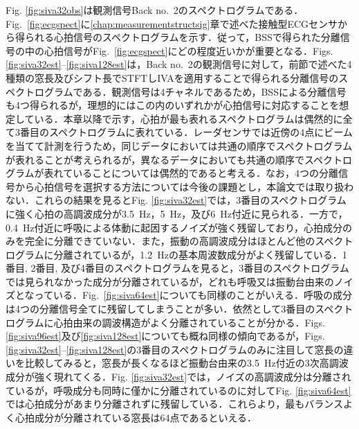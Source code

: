 Fig. \ref{fig:siva32obs}は観測信号Back no.~2のスペクトログラムである．Fig.~\ref{fig:ecgspect}に\ref{chap:measurementstructsig}章で述べた接触型ECGセンサから得られる心拍信号のスペクトログラムを示す．従って，BSSで得られた分離信号の中の心拍信号がFig.~\ref{fig:ecgspect}にどの程度近いかが重要となる．Figs. \ref{fig:siva32est}--\ref{fig:siva128est}は，Back no.~2の観測信号に対して，前節で述べた4種類の窓長及びシフト長でSTFTしIVAを適用することで得られる分離信号のスペクトログラムである．観測信号は4チャネルであるため，BSSによる分離信号も4つ得られるが，理想的にはこの内のいずれかが心拍信号に対応することを想定している．本章以降で示す，心拍が最も表れるスペクトログラムは偶然的に全て3番目のスペクトログラムに表れている．レーダセンサでは近傍の4点にビームを当てて計測を行うため，同じデータにおいては共通の順序でスペクトログラムが表れることが考えられるが，異なるデータにおいても共通の順序でスペクトログラムが表れていることについては偶然的であると考える．なお，4つの分離信号から心拍信号を選択する方法については今後の課題とし，本論文では取り扱わない．これらの結果を見るとFig. \ref{fig:siva32est}では，3番目のスペクトログラムに強く心拍の高調波成分が3.5~Hz，5~Hz，及び6~Hz付近に見られる．一方で，0.4~Hz付近に呼吸による体動に起因するノイズが強く残留しており，心拍成分のみを完全に分離できていない．また，振動の高調波成分はほとんど他のスペクトログラムに分離されているが，1.2~Hzの基本周波数成分がよく残留している．1番目, 2番目, 及び4番目のスペクトログラムを見ると，3番目のスペクトログラムでは見られなかった成分が分離されているが，どれも呼吸又は振動台由来のノイズとなっている．Fig.~\ref{fig:siva64est}についても同様のことがいえる．呼吸の成分は4つの分離信号全てに残留してしまうことが多い．依然として3番目のスペクトログラムに心拍由来の調波構造がよく分離されていることが分かる．Figs. \ref{fig:siva96est}及び\ref{fig:siva128est}についても概ね同様の傾向であるが，Figs. \ref{fig:siva32est}--\ref{fig:siva128est}の3番目のスペクトログラムのみに注目して窓長の違いを比較してみると，窓長が長くなるほど振動台由来の3.5~Hz付近の3次高調波成分が強く現れてくる．Fig. \ref{fig:siva32est}では，ノイズの高調波成分は分離されているが，呼吸成分も同時に僅かに分離されているのに対してFig. \ref{fig:siva64est}では心拍成分があまり分離されずに残留している．これらより，最もバランスよく心拍成分が分離されている窓長は64点であるといえる．


